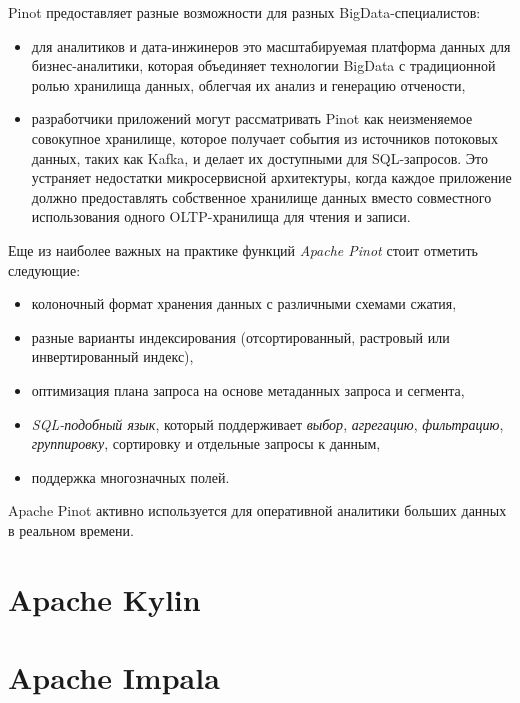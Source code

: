 \documentclass[%
	11pt,
	a4paper,
	utf8,
		]{article}
\begin{document}
Pinot предоставляет разные возможности для разных BigData-специалистов:
\begin{itemize}
	\item для аналитиков и дата-инжинеров это масштабируемая платформа данных для бизнес-аналитики, которая объединяет технологии BigData с традиционной ролью хранилища данных, облегчая их анализ и генерацию отчености,
	
	\item разработчики приложений могут рассматривать Pinot как неизменяемое совокупное хранилище, которое получает события из источников потоковых данных, таких как Kafka, и делает их доступными для SQL-запросов. Это устраняет недостатки микросервисной архитектуры, когда каждое приложение должно предоставлять собственное хранилище данных вместо совместного использования одного OLTP-хранилища для чтения и записи. 
\end{itemize}

Еще из наиболее важных на практике функций \emph{Apache Pinot} стоит отметить следующие:
\begin{itemize}
	\item колоночный формат хранения данных с различными схемами сжатия,
	
	\item разные варианты индексирования (отсортированный, растровый или инвертированный индекс),
	
	\item оптимизация плана запроса на основе метаданных запроса и сегмента,
	
	\item \emph{SQL-подобный язык}, который поддерживает \emph{выбор}, \emph{агрегацию}, \emph{фильтрацию}, \emph{группировку}, сортировку и отдельные запросы к данным,
	
	\item поддержка многозначных полей.
\end{itemize}

Apache Pinot активно используется для оперативной аналитики больших данных в реальном времени.

\section{Apache Kylin}


\section{Apache Impala}
\end{document}
